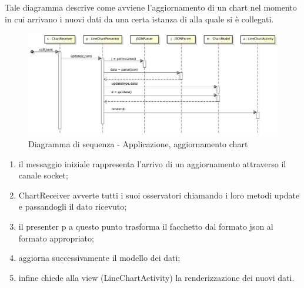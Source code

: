             Tale diagramma descrive come avviene l'aggiornamento di un chart nel momento in cui arrivano i nuovi dati da una certa istanza di  alla quale si è collegati.
            \begin{figure}[H]
                \centering
                \includegraphics[scale=0.3]{DefinizioneDiProdotto/Pics/ApplicazioneAggiornamentoChart}
                \caption{Diagramma di sequenza - Applicazione, aggiornamento chart}
            \end{figure}
            \begin{enumerate}
                \item il messaggio iniziale rappresenta l'arrivo di un aggiornamento attraverso il canale socket;
                \item ChartReceiver avverte tutti i suoi osservatori chiamando i loro metodi update e passandogli il dato ricevuto;
                \item il presenter p a questo punto trasforma il facchetto dal formato json al formato appropriato;
                \item aggiorna successivamente il modello dei dati;
                \item infine chiede alla view (LineChartActivity) la renderizzazione dei nuovi dati.
            \end{enumerate}